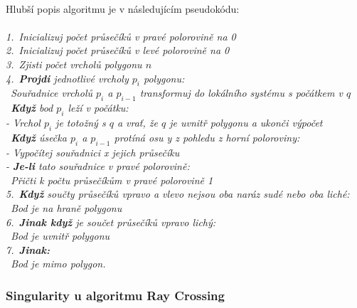 \documentclass{article}
\begin{document}
\vspace{0.2cm}\\
Hlubší popis algoritmu je v následujícím pseudokódu:\\
\vspace{0.2cm}\\
\indent\textit{\textrm{1.~}Inicializuj počet průsečíků v pravé polorovině na 0}\\
\indent\textit{\textrm{2.~}Inicializuj počet průsečíků v levé polorovině na 0}\\
\indent\textit{\textrm{3.~}Zjisti počet vrcholů polygonu $n$}\\
\indent\textit{\textrm{4.~}\textbf{Projdi} jednotlivé vrcholy $p_{i}$ polygonu:}\\
\indent\indent\textit{\textbullet\ Souřadnice vrcholů $p_{i}$ a $p_{i-1}$ transformuj do lokálního systému s počátkem v $q$}\\
\indent\indent\textit{\textbullet\ \textbf{Když} bod $p_{i}$ leží v počátku:}\\
\indent\indent\indent\textit{\textrm{- }Vrchol $p_{i}$ je totožný s $q$ a vrať, že $q$ je uvnitř polygonu a ukonči výpočet}\\
\indent\indent\textit{\textbullet\ \textbf{Když} úsečka $p_{i}$ a $p_{i-1}$ protíná osu y z pohledu z horní poloroviny:}\\
\indent\indent\indent\textit{\textrm{- }Vypočítej souřadnici x jejich průsečíku}\\
\indent\indent\indent\textit{\textrm{- }\textbf{Je-li} tato souřadnice v pravé polorovině:}\\
\indent\indent\indent\indent\textit{\textbullet\ Přičti k počtu průsečíkům v pravé polorovině 1}\\
\indent\textit{\textrm{5.~}\textbf{Když} součty průsečíků vpravo a vlevo nejsou oba naráz sudé nebo oba liché:}\\
\indent\indent\textit{\textbullet\ Bod je na hraně polygonu}\\
\indent\textit{\textrm{6.~}\textbf{Jinak když} je součet průsečíků vpravo lichý:}\\
\indent\indent\textit{\textbullet\ Bod je uvnitř polygonu}\\
\indent\textit{\textrm{7.~}\textbf{Jinak:}}\\
\indent\indent\textit{\textbullet\ Bod je mimo polygon.}
\subsubsection{\small{Singularity u algoritmu Ray Crossing}}
\end{document}
